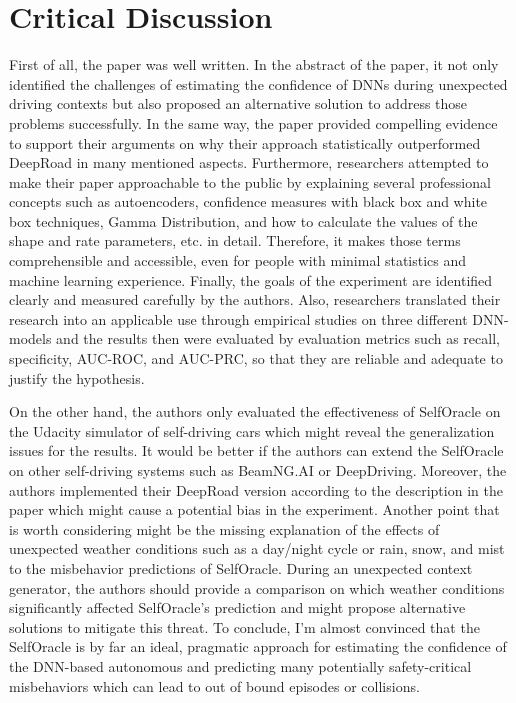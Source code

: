 \documentclass[10pt,a4paper]{report}
\begin{document}
\section{Critical Discussion}
First of all, the paper was well written. In the abstract of the paper, it not only identified the challenges of estimating the confidence of DNNs during unexpected driving contexts but also proposed an alternative solution to address those problems successfully. 
%
In the same way, the paper provided compelling evidence to support their arguments on why their approach statistically outperformed DeepRoad in many mentioned aspects. 
%
Furthermore, researchers attempted to make their paper approachable to the public by explaining several professional concepts such as autoencoders, confidence measures with black box and white box techniques, Gamma Distribution, and how to calculate the values of the shape and rate parameters, etc. in detail. 
%
Therefore, it makes those terms comprehensible and accessible, even for people with minimal statistics and machine learning experience.
%
Finally, the goals of the experiment are identified clearly and measured carefully by the authors. 
%
Also, researchers translated their research into an applicable use through empirical studies on three different DNN-models and the results then were evaluated by evaluation metrics such as recall, specificity, AUC-ROC, and AUC-PRC, so that they are reliable and adequate to justify the hypothesis.
%

On the other hand, the authors only evaluated the effectiveness of SelfOracle on the Udacity simulator of self-driving cars which might reveal the generalization issues for the results.
%
It would be better if the authors can extend the SelfOracle on other self-driving systems such as BeamNG.AI or DeepDriving.
%
Moreover, the authors implemented their DeepRoad version according to the description in the paper which might cause a potential bias in the experiment.
%
Another point that is worth considering might be the missing explanation of the effects of unexpected weather conditions such as a day/night cycle or rain, snow, and mist to the misbehavior predictions of SelfOracle.
%
During an unexpected context generator, the authors should provide a comparison on which weather conditions significantly affected SelfOracle's prediction and might propose alternative solutions to mitigate this threat.
%
To conclude, I’m almost convinced that the SelfOracle is by far an ideal, pragmatic approach for estimating the confidence of the DNN-based autonomous and predicting many potentially safety-critical misbehaviors which can lead to out of bound episodes or collisions.
\end{document}
